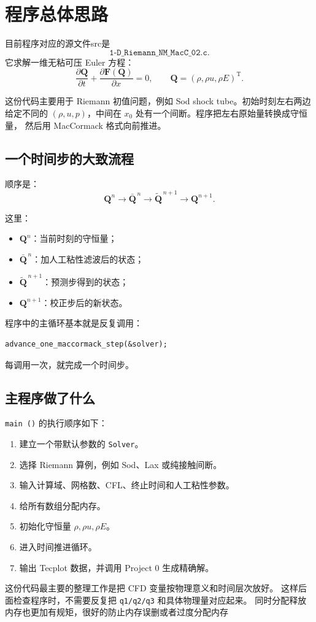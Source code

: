 \section{程序总体思路}
目前程序对应的源文件src是
\[
\texttt{1-D\_Riemann\_NM\_MacC\_02.c}.
\]
它求解一维无粘可压 Euler 方程：
\[
\frac{\partial \bm Q}{\partial t}
+\frac{\partial \bm F(\bm Q)}{\partial x}=0,
\qquad
\bm Q=(\rho,\rho u,\rho E)^{\mathrm T}.
\]

这份代码主要用于 Riemann 初值问题，例如 Sod shock tube。初始时刻左右两边给定不同的
\((\rho,u,p)\)，中间在 \(x_0\) 处有一个间断。程序把左右原始量转换成守恒量，
然后用 MacCormack 格式向前推进。

\subsection{一个时间步的大致流程}

顺序是：
\[
\bm Q^n
\rightarrow
\bar{\bm Q}^{\,n}
\rightarrow
\tilde{\bm Q}^{\,n+1}
\rightarrow
\bm Q^{n+1}.
\]

这里：
\begin{itemize}
    \item \(\bm Q^n\)：当前时刻的守恒量；
    \item \(\bar{\bm Q}^{\,n}\)：加人工粘性滤波后的状态；
    \item \(\tilde{\bm Q}^{\,n+1}\)：预测步得到的状态；
    \item \(\bm Q^{n+1}\)：校正步后的新状态。
\end{itemize}

程序中的主循环基本就是反复调用：
\begin{lstlisting}
advance_one_maccormack_step(&solver);
\end{lstlisting}
每调用一次，就完成一个时间步。

\subsection{主程序做了什么}

\texttt{main ()} 的执行顺序如下：

\begin{enumerate}[label=\arabic*.]
    \item 建立一个带默认参数的 \texttt{Solver}。
    \item 选择 Riemann 算例，例如 Sod、Lax 或纯接触间断。
    \item 输入计算域、网格数、CFL、终止时间和人工粘性参数。
    \item 给所有数组分配内存。
    \item 初始化守恒量 \(\rho,\rho u,\rho E\)。
    \item 进入时间推进循环。
    \item 输出 Tecplot 数据，并调用 Project 0 生成精确解。
\end{enumerate}

这份代码最主要的整理工作是把 CFD 变量按物理意义和时间层次放好。
这样后面检查程序时，不需要反复把 \texttt{q1/q2/q3} 和具体物理量对应起来。
同时分配释放内存也更加有规矩，很好的防止内存误删或者过度分配内存
